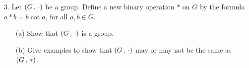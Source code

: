 \newpage
\begin{mdframed}[style=darkQuesion]
  3. Let $\left(G\,,\,\cdot\right)$ be a group. Define a new binary operation $\ast$ on
  $G$ by the formula $a \ast b=b\cot a$, for all $a,b\in G$.
  \begin{itemize}
    \item[(a)]{Show that $\left(G\,,\,\cdot\right)$ is a group.}
    \item[(b)]{Give examples to show that $\left(G\,,\,\cdot\right)$ may or may not be the
          same as $\left(G\,,\,\ast\right)$.}
  \end{itemize}
\end{mdframed}

